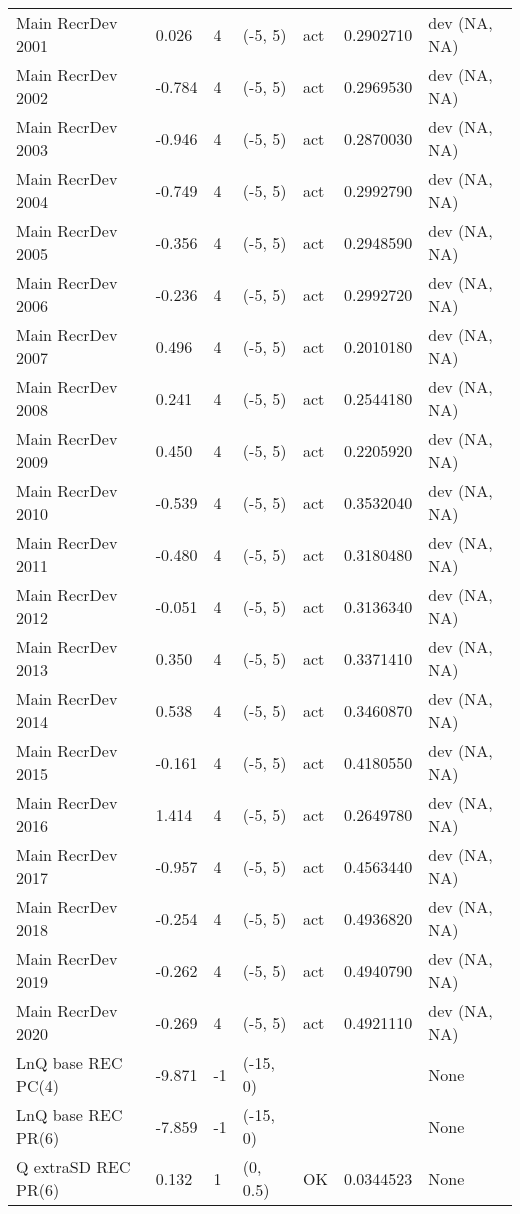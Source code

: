 \documentclass[11pt,
  english,
  a4paper,
]{article}
\begin{document}
\begin{landscape}
\begin{longtable}[t]{>{\raggedright\arraybackslash}p{8.5cm}lllll>{\raggedright\arraybackslash}p{4cm}}
Main RecrDev 2001 & 0.026 & 4 & (-5, 5) & act & 0.2902710 & dev (NA, NA)\\
Main RecrDev 2002 & -0.784 & 4 & (-5, 5) & act & 0.2969530 & dev (NA, NA)\\
Main RecrDev 2003 & -0.946 & 4 & (-5, 5) & act & 0.2870030 & dev (NA, NA)\\
Main RecrDev 2004 & -0.749 & 4 & (-5, 5) & act & 0.2992790 & dev (NA, NA)\\
Main RecrDev 2005 & -0.356 & 4 & (-5, 5) & act & 0.2948590 & dev (NA, NA)\\
Main RecrDev 2006 & -0.236 & 4 & (-5, 5) & act & 0.2992720 & dev (NA, NA)\\
Main RecrDev 2007 & 0.496 & 4 & (-5, 5) & act & 0.2010180 & dev (NA, NA)\\
Main RecrDev 2008 & 0.241 & 4 & (-5, 5) & act & 0.2544180 & dev (NA, NA)\\
Main RecrDev 2009 & 0.450 & 4 & (-5, 5) & act & 0.2205920 & dev (NA, NA)\\
Main RecrDev 2010 & -0.539 & 4 & (-5, 5) & act & 0.3532040 & dev (NA, NA)\\
Main RecrDev 2011 & -0.480 & 4 & (-5, 5) & act & 0.3180480 & dev (NA, NA)\\
Main RecrDev 2012 & -0.051 & 4 & (-5, 5) & act & 0.3136340 & dev (NA, NA)\\
Main RecrDev 2013 & 0.350 & 4 & (-5, 5) & act & 0.3371410 & dev (NA, NA)\\
Main RecrDev 2014 & 0.538 & 4 & (-5, 5) & act & 0.3460870 & dev (NA, NA)\\
Main RecrDev 2015 & -0.161 & 4 & (-5, 5) & act & 0.4180550 & dev (NA, NA)\\
Main RecrDev 2016 & 1.414 & 4 & (-5, 5) & act & 0.2649780 & dev (NA, NA)\\
Main RecrDev 2017 & -0.957 & 4 & (-5, 5) & act & 0.4563440 & dev (NA, NA)\\
Main RecrDev 2018 & -0.254 & 4 & (-5, 5) & act & 0.4936820 & dev (NA, NA)\\
Main RecrDev 2019 & -0.262 & 4 & (-5, 5) & act & 0.4940790 & dev (NA, NA)\\
Main RecrDev 2020 & -0.269 & 4 & (-5, 5) & act & 0.4921110 & dev (NA, NA)\\
LnQ base REC PC(4) & -9.871 & -1 & (-15, 0) &  &  & None\\
LnQ base REC PR(6) & -7.859 & -1 & (-15, 0) &  &  & None\\
Q extraSD REC PR(6) & 0.132 & 1 & (0, 0.5) & OK & 0.0344523 & None\\

\end{longtable}
\end{landscape}
\end{document}
